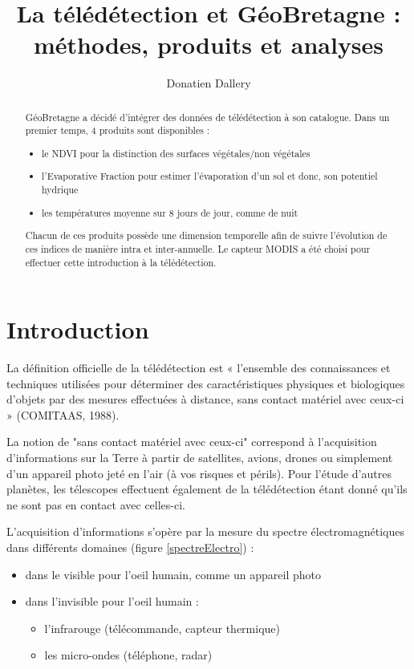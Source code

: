 \documentclass[10pt,a4paper]{article}
\author{Donatien Dallery}
\title{La télédétection et GéoBretagne : méthodes, produits et analyses}
\begin{document}
\maketitle

\begin{abstract}
GéoBretagne a décidé d'intégrer des données de télédétection à son catalogue. Dans un premier temps, 4 produits sont disponibles : 
\begin{itemize}
\item le NDVI pour la distinction des surfaces végétales/non végétales
\item l'Evaporative Fraction pour estimer l'évaporation d'un sol et donc, son potentiel hydrique
\item les températures moyenne sur 8 jours de jour, comme de nuit
\end{itemize}
Chacun de ces produits possède une dimension temporelle afin de suivre l'évolution de ces indices de manière intra et inter-annuelle. Le capteur MODIS a été choisi pour effectuer cette introduction à la télédétection.
\end{abstract}

\section{Introduction}

La définition officielle de la télédétection est « l’ensemble des connaissances et techniques utilisées pour déterminer des caractéristiques physiques et biologiques d’objets par des mesures effectuées à distance, sans contact matériel avec ceux-ci » (COMITAAS, 1988).\smallbreak

La notion de "sans contact matériel avec ceux-ci" correspond à l'acquisition d'informations sur la Terre à partir de satellites, avions, drones ou simplement d'un appareil photo jeté en l'air (à vos risques et périls). Pour l'étude d'autres planètes, les télescopes effectuent également de la télédétection étant donné qu'ils ne sont pas en contact avec celles-ci.\smallbreak

L'acquisition d'informations s'opère par la mesure du  spectre électromagnétiques dans différents domaines (figure \ref{spectreElectro}) :
\begin{itemize}
\item dans le visible pour l'oeil humain, comme un appareil photo
\item dans l'invisible pour l'oeil humain :
\begin{itemize}
\item l'infrarouge (télécommande, capteur thermique)
\item les micro-ondes (téléphone, radar)
\end{itemize}
\end{itemize}
\end{document}
